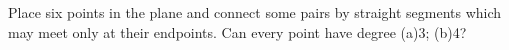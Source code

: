 Place six points in the plane and connect some pairs by straight segments which may meet only at their endpoints. Can every point have degree (a)3; (b)4?
